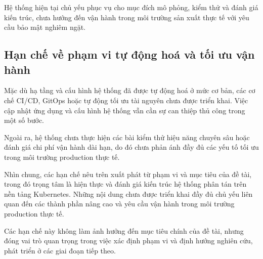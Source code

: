 Hệ thống hiện tại chủ yếu phục vụ cho mục đích mô phỏng, kiểm thử và đánh giá kiến
trúc, chưa hướng đến vận hành trong môi trường sản xuất thực tế với yêu cầu bảo
mật nghiêm ngặt.

\subsection{Hạn chế về phạm vi tự động hoá và tối ưu vận hành}

Mặc dù hạ tầng và cấu hình hệ thống đã được tự động hoá ở mức cơ bản, các cơ chế
CI/CD, GitOps hoặc tự động tối ưu tài nguyên chưa được triển khai. Việc cập nhật
ứng dụng và cấu hình hệ thống vẫn cần sự can thiệp thủ công trong một số bước.

Ngoài ra, hệ thống chưa thực hiện các bài kiểm thử hiệu năng chuyên sâu hoặc đánh
giá chi phí vận hành dài hạn, do đó chưa phản ánh đầy đủ các yếu tố tối ưu trong
môi trường production thực tế.

Nhìn chung, các hạn chế nêu trên xuất phát từ phạm vi và mục tiêu của đề tài,
trong đó trọng tâm là hiện thực và đánh giá kiến trúc hệ thống phân tán trên nền
tảng Kubernetes. Những nội dung chưa được triển khai đầy đủ chủ yếu liên quan đến
các thành phần nâng cao và yêu cầu vận hành trong môi trường production thực tế.

Các hạn chế này không làm ảnh hưởng đến mục tiêu chính của đề tài, nhưng đóng vai
trò quan trọng trong việc xác định phạm vi và định hướng nghiên cứu, phát triển
ở các giai đoạn tiếp theo.

